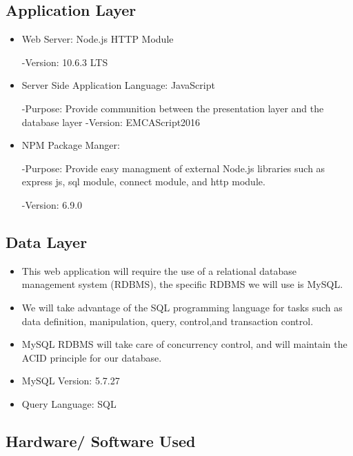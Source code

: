 \documentclass[letter, 12pt, titlepage]{article}
\begin{document}
		\subsection{Application Layer}
		\begin{itemize}
			\item Web Server: Node.js HTTP Module
			
				-Version: 10.6.3 LTS
			
			\item Server Side Application Language: JavaScript
				
				-Purpose: Provide communition between the presentation layer and the database layer
				-Version: EMCAScript2016

			\item	NPM Package Manger:

				-Purpose: Provide easy managment of external Node.js libraries such as express js, sql module, connect module, and http module.

				-Version: 6.9.0 
		\end{itemize}	
		\subsection{Data Layer}
		
			\begin{itemize}
			
			\item	This web application will require the use of a relational database management system (RDBMS), the specific RDBMS we will use is  MySQL.
			\item We will take advantage of the SQL programming language for tasks such as data definition, manipulation, query, control,and transaction control.
			\item MySQL RDBMS will take care of concurrency control, and will maintain the ACID principle for our database. 
			\item MySQL Version: 5.7.27
			\item Query Language: SQL
			\end{itemize}
		\subsection{Hardware/ Software Used}
		
\end{document}
